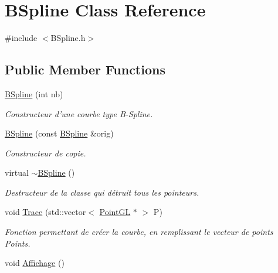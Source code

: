 \hypertarget{classBSpline}{\section{B\-Spline Class Reference}
\label{classBSpline}
}


{\ttfamily \#include $<$B\-Spline.\-h$>$}

\subsection*{Public Member Functions}
\begin{DoxyCompactItemize}
\item 
\hyperlink{classBSpline_a270bffd29442d124a0a063502c0f1f37}{B\-Spline} (int nb)
\begin{DoxyCompactList}\small\item\em Constructeur d'une courbe type B-\/\-Spline. \end{DoxyCompactList}\item 
\hypertarget{classBSpline_a7c86b59f6e656ecc3c78ef4e1f35ca98}{\hyperlink{classBSpline_a7c86b59f6e656ecc3c78ef4e1f35ca98}{B\-Spline} (const \hyperlink{classBSpline}{B\-Spline} \&orig)}\label{classBSpline_a7c86b59f6e656ecc3c78ef4e1f35ca98}

\begin{DoxyCompactList}\small\item\em Constructeur de copie. \end{DoxyCompactList}\item 
\hypertarget{classBSpline_a535039ab5127dc644a1a121faedf88b3}{virtual \hyperlink{classBSpline_a535039ab5127dc644a1a121faedf88b3}{$\sim$\-B\-Spline} ()}\label{classBSpline_a535039ab5127dc644a1a121faedf88b3}

\begin{DoxyCompactList}\small\item\em Destructeur de la classe qui détruit tous les pointeurs. \end{DoxyCompactList}\item 
void \hyperlink{classBSpline_a21eed7e5829622d86020706210532bd3}{Trace} (std\-::vector$<$ \hyperlink{classPointGL}{Point\-G\-L} $\ast$ $>$ P)
\begin{DoxyCompactList}\small\item\em Fonction permettant de créer la courbe, en remplissant le vecteur de points Points. \end{DoxyCompactList}\item 
\hypertarget{classBSpline_a81e035fc5c4b4748e2ba24ea0a60db1b}{void \hyperlink{classBSpline_a81e035fc5c4b4748e2ba24ea0a60db1b}{Affichage} ()}\label{classBSpline_a81e035fc5c4b4748e2ba24ea0a60db1b}


\end{DoxyCompactItemize}
